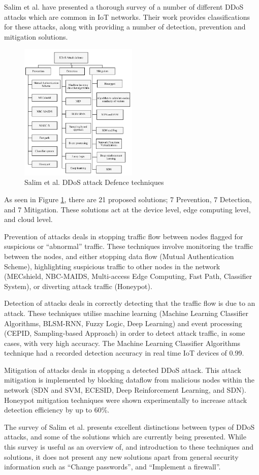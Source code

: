 Salim et al.\cite{Salim2019} have presented a thorough survey of a number of different DDoS
attacks which are common in IoT networks. Their work provides classifications
for these attacks, along with providing a number of detection, prevention and
mitigation solutions.

\begin{figure}[H]
	\centering
	\includegraphics[width=0.5\textwidth]{images/salimDefenseDiagram.png}
	\caption{Salim et al. DDoS attack Defence techniques\cite{Salim2019}}
	\label{fig:salimDefense}
\end{figure}

As seen in Figure \ref{fig:salimDefense}, there are 21 proposed solutions; 7
Prevention, 7 Detection, and 7 Mitigation. These solutions act at the device
level, edge computing level, and cloud level.

Prevention of attacks deals in stopping traffic flow between nodes flagged for
suspicious or ``abnormal'' traffic. These techniques involve
monitoring the traffic between the nodes, and either stopping data flow (Mutual
Authentication Scheme), highlighting suspicious traffic to other nodes in the
network (MECshield, NBC-MAIDS, Multi-access Edge Computing, Fast Path,
Classifier System), or diverting attack traffic (Honeypot).

Detection of attacks deals in correctly detecting that the traffic flow is due
to an attack. These techniques utilise machine learning (Machine Learning
Classifier Algorithms, BLSM-RNN, Fuzzy Logic, Deep Learning) and event processing
(CEPID, Sampling-based Approach) in order to detect attack traffic, in some
cases, with very high accuracy. The Machine Learning Classifier Algorithms
technique had a recorded detection accuracy in real time IoT devices of 0.99.

Mitigation of attacks deals in stopping a detected DDoS attack. This attack
mitigation is implemented by blocking dataflow from malicious nodes within the
network (SDN and SVM, ECESID, Deep Reinforcement Learning, and SDN). Honeypot
mitigation techniques were shown experimentally to increase attack detection
efficiency by up to 60\%.

The survey of Salim et al.\cite{Salim2019} presents excellent distinctions
between types of DDoS attacks, and some of the solutions which are currently
being presented. While this survey is useful as an overview of, and introduction
to these techniques and solutions, it does not present any new solutions apart
from general security information such as ``Change passwords'', and ``Implement
a firewall''.
